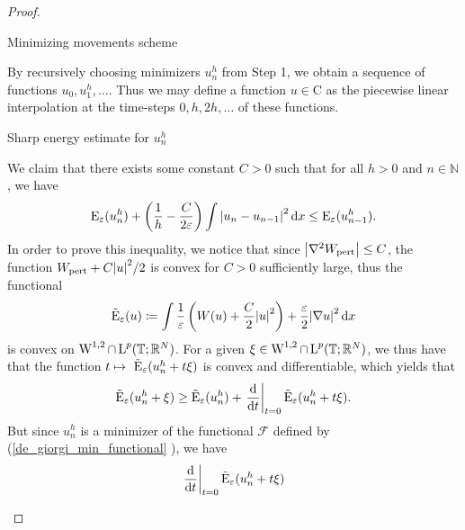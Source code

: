 \begin{proof}
\begin{description}[wide=0pt]
	\item[Step 2:] Minimizing movements scheme 
	
	By recursively choosing minimizers $ u_{ n }^{ h } $ from Step 1, we obtain a sequence of functions $ u_{ 0 }, u_{ 1 }^{ h } , \dotsc $. Thus we may define a function $ u \in \mathrm{ C } $ as the piecewise linear interpolation at the time-steps $ 0, h , 2h, \dotsc $ of these functions.
	
	\item[Step 3:] Sharp energy estimate for $ u_{ n }^{ h } $
	
	We claim that there exists some constant $ C > 0 $ such that for all $ h > 0 $ and $ n \in \mathbb{ N } $, we have
	\begin{equation}
		\label{discrete_optimal_energy_dissipation}
		\operatorname{E}_{ \varepsilon } ( u_{ n }^{ h } )
		+
		\left( \frac{ 1 }{ h } - \frac{ C }{ 2 \varepsilon } \right)
		\int \abs{ u_{ n } - u_{ n - 1 } }^{ 2 } \dd{ x }
		\leq
		\operatorname{E}_{ \varepsilon } ( u_{ n - 1 }^{ h } ).
	\end{equation}
	In order to prove this inequality, we notice that since $ \abs{ \nabla^{ 2 } W_{ \mathrm{pert} } } \leq C $, the function $ W_{ \mathrm{pert} } + C \abs{ u }^{ 2 }/2 $ is convex for $ C > 0 $ sufficiently large, thus the functional 
	\begin{equation*}
		\tilde{\operatorname{E}}_{ \varepsilon }  ( u )
		\coloneqq
		\int 
			\frac{ 1 }{ \varepsilon }
			\left( W ( u ) + \frac{ C }{ 2 } \abs{ u }^{ 2 } \right)
			+
			\frac{ \varepsilon}{ 2 }
			\abs{ \nabla u }^{ 2 }
		\dd{ x }
	\end{equation*}
	is convex on $ \operatorname{W}^{ 1 , 2 } \cap \operatorname{L}^{ p } ( \mathbb{ T } ; \mathbb{ R }^{ N } ) $. For a given $ \xi \in \operatorname{W}^{ 1 , 2 } \cap \operatorname{L}^{ p } ( \mathbb{ T } ; \mathbb{ R }^{ N } ) $, we thus have that the function
	$ t \mapsto \ \tilde{\operatorname{E}}_{ \varepsilon } ( u_{ n }^{ h } + t \xi ) $ is convex and differentiable, which yields that
	\begin{equation}
		\label{convexity_at_time_1}
		\tilde{\operatorname{E}}_{ \varepsilon } ( u_{ n }^{ h } + \xi )
		\geq
		\tilde{\operatorname{E}}_{ \varepsilon } ( u_{ n }^{ h } ) + 
		\left.\dv{ t }\right|_{ t = 0 } \tilde{\operatorname{E}}_{ \varepsilon } ( u_{ n }^{ h } + t \xi).
	\end{equation} 
	But since $ u_{ n }^{ h } $ is a minimizer of the functional $\mathcal{ F }$ defined by (\ref{de_giorgi_min_functional} ), we have
	\begin{align*}
		\left. \dv{ t } \right|_{ t= 0 }
			\tilde{\energy}_{ \varepsilon} ( u_{ n }^{ h } + t \xi )

\end{align*}
\end{description}
\end{proof}
